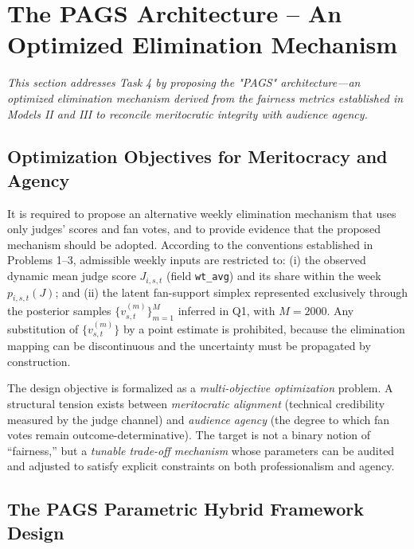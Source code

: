 \section{The PAGS Architecture – An Optimized Elimination Mechanism  }
\label{sec:q4}

\noindent \textit{This section addresses Task 4 by proposing the "PAGS" architecture—an optimized elimination mechanism derived from the fairness metrics established in Models II and III to reconcile meritocratic integrity with audience agency.}

\vspace{1em}

\subsection{Optimization Objectives for Meritocracy and Agency }
\label{sec:q4_analysis}

It is required to propose an alternative weekly elimination mechanism that uses only judges' scores and fan votes, and to provide evidence that the proposed mechanism should be adopted. According to the conventions established in Problems 1--3, admissible weekly inputs are restricted to: (i) the observed dynamic mean judge score $J_{i,s,t}$ (field \texttt{wt\_avg}) and its share within the week $p_{i,s,t}(J)$; and (ii) the latent fan-support simplex represented exclusively through the posterior samples $\{v^{(m)}_{s,t}\}_{m=1}^{M}$ inferred in Q1, with $M=2000$. Any substitution of $\{v^{(m)}_{s,t}\}$ by a point estimate is prohibited, because the elimination mapping can be discontinuous and the uncertainty must be propagated by construction.

The design objective is formalized as a \emph{multi-objective optimization} problem. A structural tension exists between \emph{meritocratic alignment} (technical credibility measured by the judge channel) and \emph{audience agency} (the degree to which fan votes remain outcome-determinative). The target is not a binary notion of ``fairness,'' but a \emph{tunable trade-off mechanism} whose parameters can be audited and adjusted to satisfy explicit constraints on both professionalism and agency.

\subsection{The PAGS Parametric Hybrid Framework Design }
\label{sec:q4_model}

